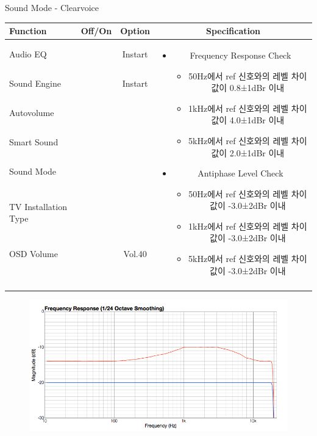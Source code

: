 \begin{frame}[t]{Sound Mode - Clearvoice}
\begin{tiny}
\begin{tabular}{@{}lccc@{}}
\toprule
Function & Off/On & Option & Specification \\
\midrule
Audio EQ & \color{black}{Off} & Instart &
\multirow{10}{60mm}{
\begin{itemize}
	\item Frequency Response Check
	\begin{itemize}
		\item 50Hz에서 ref 신호와의 레벨 차이값이 0.8±1dBr 이내
		\item 1kHz에서 ref 신호와의 레벨 차이값이 4.0±1dBr 이내
		\item 5kHz에서 ref 신호와의 레벨 차이값이 2.0±1dBr 이내	
	\end{itemize}
	\item Antiphase Level Check
	\begin{itemize}
		\item 50Hz에서 ref 신호와의 레벨 차이값이 -3.0±2dBr 이내
		\item 1kHz에서 ref 신호와의 레벨 차이값이 -3.0±2dBr 이내
		\item 5kHz에서 ref 신호와의 레벨 차이값이 -3.0±2dBr 이내
	\end{itemize}	
\end{itemize}
} \\
Sound Engine & \color{blue}{On} & Instart & \\
Autovolume & \color{black}{Off} & & \\
Smart Sound & \color{black}{Off} & & \\
Sound Mode & \color{blue}{On} & \color{blue}{Clearvoice} & \\
TV Installation Type & \color{blue}{On} & \color{black}{Standtype1} & \\
OSD Volume & \color{blue}{On} & Vol.40 & \\
& & & \\
& & & \\
& & & \\
& & & \\\midrule
\end{tabular}
\end{tiny}

\begin{figure}[b]
\includegraphics[height=0.4\textwidth]{figures/clearvoice.png}
\end{figure}

\end{frame}



